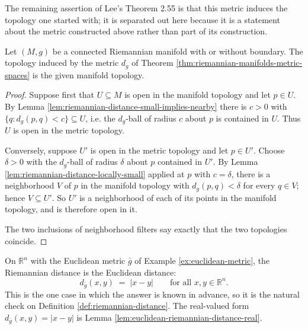 The remaining assertion of Lee's Theorem 2.55 is that this metric induces the topology one
started with; it is separated out here because it is a statement about the metric
constructed above rather than part of its construction.

\begin{theorem}
\label{thm:riemannian-distance-topology}
\leanok
{}
Let $(M,g)$ be a connected Riemannian manifold with or without boundary. The topology
induced by the metric $d_g$ of Theorem \ref{thm:riemannian-manifolds-metric-spaces} is the
given manifold topology.
\end{theorem}

\begin{proof}
\leanok
{}
Suppose first that $U \subseteq M$ is open in the manifold topology and let $p \in U$. By
Lemma \ref{lem:riemannian-distance-small-implies-nearby} there is $c > 0$ with
$\{q : d_g(p,q) < c\} \subseteq U$, i.e. the $d_g$-ball of radius $c$ about $p$ is contained
in $U$. Thus $U$ is open in the metric topology.

Conversely, suppose $U'$ is open in the metric topology and let $p \in U'$. Choose $\delta > 0$
with the $d_g$-ball of radius $\delta$ about $p$ contained in $U'$. By
Lemma \ref{lem:riemannian-distance-locally-small} applied at $p$ with $c = \delta$, there is a
neighborhood $V$ of $p$ in the manifold topology with $d_g(p,q) < \delta$ for every $q \in V$;
hence $V \subseteq U'$. So $U'$ is a neighborhood of each of its points in the manifold
topology, and is therefore open in it.

The two inclusions of neighborhood filters say exactly that the two topologies coincide.
\end{proof}

\begin{proposition}
\label{prop:euclidean-riemannian-distance}
\leanok
{}
On $\mathbb{R}^n$ with the Euclidean metric $\bar g$ of Example \ref{ex:euclidean-metric},
the Riemannian distance is the Euclidean distance:
\[
  d_{\bar g}(x,y) \;=\; |x - y| \qquad \text{for all } x, y \in \mathbb{R}^n .
\]
This is the one case in which the answer is known in advance, so it is the natural check on
Definition \ref{def:riemannian-distance}. The real-valued form $d_{\bar g}(x,y) = |x-y|$ is
Lemma \ref{lem:euclidean-riemannian-distance-real}.
\end{proposition}

